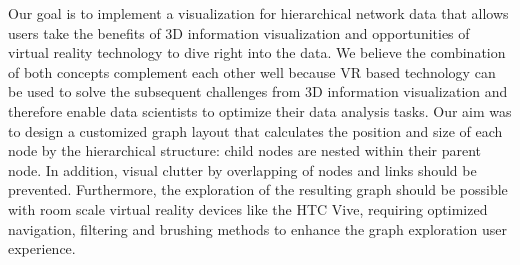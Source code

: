 Our goal is to implement a visualization for hierarchical network data that allows users take the benefits of 3D information visualization and opportunities of virtual reality technology to dive right into the data. We believe the combination of both concepts complement each other well because VR based technology can be used to solve the subsequent challenges from 3D information visualization and therefore enable data scientists to optimize their data analysis tasks. 
Our aim was to design a customized graph layout that calculates the position and size of each node by the hierarchical structure: child nodes are nested within their parent node. 
In addition, visual clutter by overlapping of nodes and links should be prevented. 
Furthermore, the exploration of the resulting graph should be possible with room scale virtual reality devices like the HTC Vive, requiring optimized navigation, filtering and brushing methods to enhance the graph exploration user experience.

